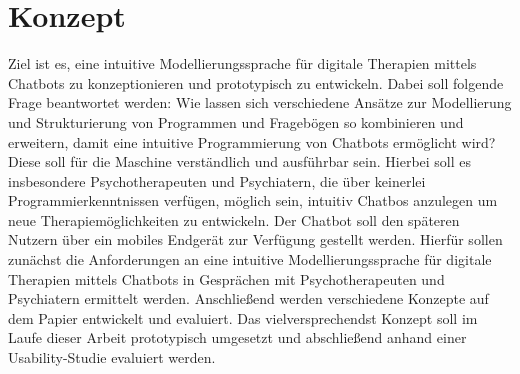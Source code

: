 \section{Konzept}
\label{ch:Konzept}
Ziel ist es, eine intuitive Modellierungssprache für digitale Therapien mittels Chatbots zu konzeptionieren und prototypisch zu entwickeln. Dabei soll folgende Frage beantwortet werden: Wie lassen sich verschiedene Ansätze zur Modellierung und Strukturierung von Programmen und Fragebögen so kombinieren und erweitern, damit eine intuitive Programmierung von Chatbots ermöglicht wird? Diese soll für die Maschine verständlich und ausführbar sein. Hierbei soll es insbesondere Psychotherapeuten und Psychiatern, die über keinerlei Programmierkenntnissen verfügen, möglich sein, intuitiv Chatbos anzulegen um neue Therapiemöglichkeiten zu entwickeln. Der Chatbot soll den späteren Nutzern über ein mobiles Endgerät zur Verfügung gestellt werden. Hierfür sollen zunächst die Anforderungen an eine intuitive Modellierungssprache für digitale Therapien mittels Chatbots in Gesprächen mit Psychotherapeuten und Psychiatern ermittelt werden. Anschließend werden verschiedene Konzepte auf dem Papier entwickelt und evaluiert. Das vielversprechendst Konzept soll im Laufe dieser Arbeit prototypisch umgesetzt und abschließend anhand einer Usability-Studie evaluiert werden. 